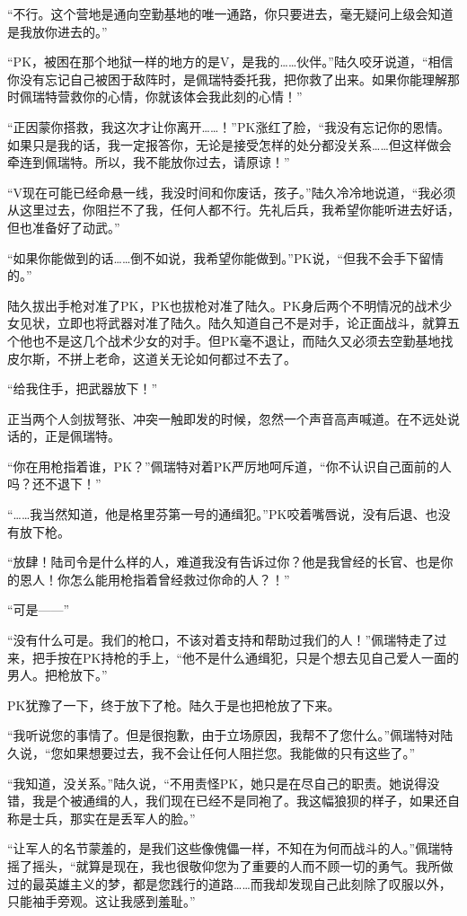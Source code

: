 “不行。这个营地是通向空勤基地的唯一通路，你只要进去，毫无疑问上级会知道是我放你进去的。”

“PK，被困在那个地狱一样的地方的是V，是我的……伙伴。”陆久咬牙说道，“相信你没有忘记自己被困于敌阵时，是佩瑞特委托我，把你救了出来。如果你能理解那时佩瑞特营救你的心情，你就该体会我此刻的心情！”

“正因蒙你搭救，我这次才让你离开……！”PK涨红了脸，“我没有忘记你的恩情。如果只是我的话，我一定报答你，无论是接受怎样的处分都没关系……但这样做会牵连到佩瑞特。所以，我不能放你过去，请原谅！”

“V现在可能已经命悬一线，我没时间和你废话，孩子。”陆久冷冷地说道，“我必须从这里过去，你阻拦不了我，任何人都不行。先礼后兵，我希望你能听进去好话，但也准备好了动武。”

“如果你能做到的话……倒不如说，我希望你能做到。”PK说，“但我不会手下留情的。”

陆久拔出手枪对准了PK，PK也拔枪对准了陆久。PK身后两个不明情况的战术少女见状，立即也将武器对准了陆久。陆久知道自己不是对手，论正面战斗，就算五个他也不是这几个战术少女的对手。但PK毫不退让，而陆久又必须去空勤基地找皮尔斯，不拼上老命，这道关无论如何都过不去了。

“给我住手，把武器放下！”

正当两个人剑拔弩张、冲突一触即发的时候，忽然一个声音高声喊道。在不远处说话的，正是佩瑞特。

“你在用枪指着谁，PK？”佩瑞特对着PK严厉地呵斥道，“你不认识自己面前的人吗？还不退下！”

“……我当然知道，他是格里芬第一号的通缉犯。”PK咬着嘴唇说，没有后退、也没有放下枪。

“放肆！陆司令是什么样的人，难道我没有告诉过你？他是我曾经的长官、也是你的恩人！你怎么能用枪指着曾经救过你命的人？！”

“可是——”

“没有什么可是。我们的枪口，不该对着支持和帮助过我们的人！”佩瑞特走了过来，把手按在PK持枪的手上，“他不是什么通缉犯，只是个想去见自己爱人一面的男人。把枪放下。”

PK犹豫了一下，终于放下了枪。陆久于是也把枪放了下来。

“我听说您的事情了。但是很抱歉，由于立场原因，我帮不了您什么。”佩瑞特对陆久说，“您如果想要过去，我不会让任何人阻拦您。我能做的只有这些了。”

“我知道，没关系。”陆久说，“不用责怪PK，她只是在尽自己的职责。她说得没错，我是个被通缉的人，我们现在已经不是同袍了。我这幅狼狈的样子，如果还自称是士兵，那实在是丢军人的脸。”

“让军人的名节蒙羞的，是我们这些像傀儡一样，不知在为何而战斗的人。”佩瑞特摇了摇头，“就算是现在，我也很敬仰您为了重要的人而不顾一切的勇气。我所做过的最英雄主义的梦，都是您践行的道路……而我却发现自己此刻除了叹服以外，只能袖手旁观。这让我感到羞耻。”

